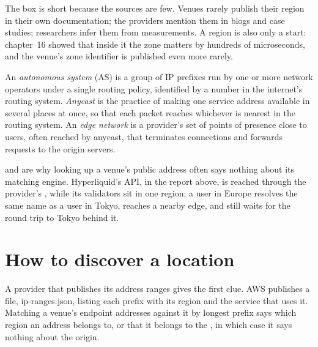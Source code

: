 The box is short because the sources are few. Venues rarely publish their region in their own documentation; the providers mention them in
blogs and case studies; researchers infer them from measurements. A region is also only a start: chapter~16 showed that inside it the zone
matters by hundreds of microseconds, and the venue's zone identifier is published even more rarely.

\begin{definition}\label{def:nw:where-the-crypto-venues-live:as}
An \emph{autonomous system} (AS) is a group of IP prefixes run by one or more network operators under a single routing
policy, identified by a number in the internet's routing system. \emph{Anycast} is the practice of making one service address
available in several places at once, so that each packet reaches whichever is nearest in the routing system. An \emph{edge
network} is a provider's set of points of presence close to users, often reached by anycast, that terminates connections
and forwards requests to the origin servers.
\end{definition}

 and  are why looking up a venue's public address often says nothing about its matching engine. Hyperliquid's API, in the
report above, is reached through the provider's , while its validators sit in one region; a user in Europe resolves the same name
as a user in Tokyo, reaches a nearby edge, and still waits for the round trip to Tokyo behind it.

\section{How to discover a location}

A provider that publishes its address ranges gives the first clue. AWS publishes a file, ip-ranges.json, listing each prefix with its region and
the service that uses it. Matching a venue's endpoint addresses against it by longest prefix says which region an address belongs to, or that
it belongs to the , in which case it says nothing about the origin.

\label{lst:nw:where-the-crypto-venues-live:match}

